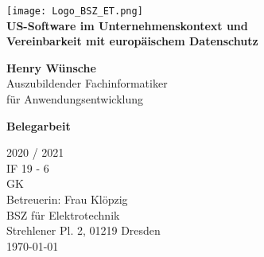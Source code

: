 \begin{titlepage}
    \begin{center}
        \texttt{[image: Logo\_BSZ\_ET.png]}\\
        \vspace*{1cm}
        {\huge\textbf{US-Software im Unternehmenskontext und\\Vereinbarkeit mit europäischem Datenschutz}}
        
        \vspace{2cm}

            {\huge\textbf{Henry Wünsche}} \\
            Auszubildender Fachinformatiker \\ für Anwendungsentwicklung

        \vfill
        {\huge\textbf{Belegarbeit}}

        \vspace{1cm}
        {\Huge 2020 / 2021}\\
        \vspace{0.8cm}
        IF 19 - 6\\
        GK\\
        Betreuerin: Frau Klöpzig\\
        BSZ für Elektrotechnik\\
        Strehlener Pl. 2, 01219 Dresden\\
        \today

    \end{center}
\end{titlepage}
\pagebreak
